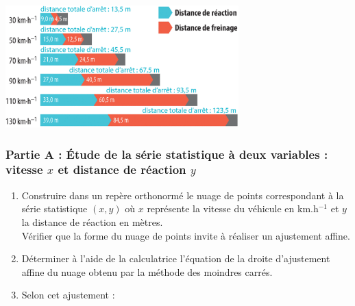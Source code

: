 \documentclass[a4paper,11pt,exos]{nsi} %
\begin{document}
{\includegraphics[width=9cm]{Ex50p242Sesamath.png}}

\subsubsection*{Partie A : Étude de la série statistique à deux variables : vitesse $x$ et distance de réaction $y$}
\begin{enumerate}
    \item Construire dans un repère orthonormé le nuage de points correspondant à la série statistique $(x,y)$ où $x$ représente la vitesse du véhicule en km.h$^{-1}$ et $y$ la distance de réaction en mètres.\\
    Vérifier que la forme du nuage de points invite à réaliser un ajustement affine.
    \item Déterminer à l'aide de la calculatrice l'équation de la droite d'ajustement affine du nuage obtenu par la méthode des moindres carrés.
    \item Selon cet ajustement :
\end{enumerate}
\end{document}
